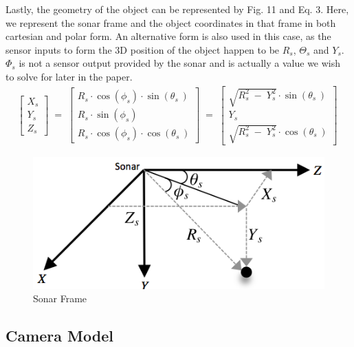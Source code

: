 \documentclass[15pt]{article}
\let\Theta\varTheta
\let\Phi\varPhi
\newcommand{\RSonar}{$\si{\textit{R}_{s}}$\xspace}
\newcommand{\ThetaSonar}{$\si{\Theta_{s}}$\xspace}
\newcommand{\PhiSonar}{$\si{\Phi_{s}}$\xspace}
\newcommand{\YSonar}{$\si{\textit{Y}_{s}}$\xspace}
\begin{document}
Lastly, the geometry of the object can be represented by Fig. 11 and Eq. 3. Here, we represent the sonar frame and the object coordinates in that frame in both cartesian and polar form. An alternative form is also used in this case, as the sensor inputs to form the 3D position of the object happen to be \RSonar, \ThetaSonar and \YSonar. \PhiSonar is not a sensor output provided by the sonar and is actually a value we wish to solve for later in the paper.
\begin{gather}
\left[ \begin{array}{c} X_{s} \\ Y_{s} \\ Z_{s} \end{array} \right]\; =\; \left[ \begin{array}{c} R_{s}\cdot \cos \left( \phi _{s} \right)\cdot \sin \left( \theta _{s\; } \right) \\ R_{s}\cdot \sin \left( \phi _{s} \right) \\ R_{s}\cdot \cos \left( \phi _{s} \right)\cdot \cos \left( \theta _{s\; } \right) \end{array} \right]\; =\; \left[ \begin{array}{c} \sqrt{R_{s}^{2}\; -\; Y_{s}^{2}}\cdot \sin \left( \theta _{s\; } \right) \\ Y_{s} \\ \sqrt{R_{s}^{2}\; -\; Y_{s}^{2}}\cdot \cos \left( \theta _{s\; } \right) \end{array} \right]\; 
\end{gather}

\begin{figure}[h!]
  \centering
  \includegraphics[scale=0.4]{sonarframe}
  \captionsetup{justification=centering}
  \caption{Sonar Frame}
\end{figure}

\subsection{Camera Model}
\end{document}
